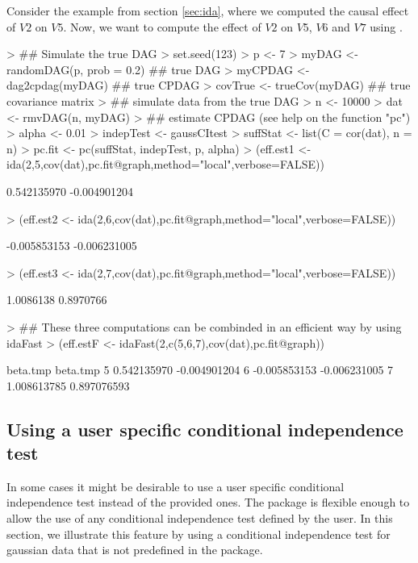 \documentclass[article]{jss}
\begin{document}
Consider the example from section \ref{sec:ida}, where we computed the
causal effect of $V2$ on $V5$. Now, we want to compute the effect of
$V2$ on $V5$, $V6$ and $V7$ using .
\begin{Schunk}
\begin{Sinput}
> ## Simulate the true DAG
> set.seed(123)
> p <- 7
> myDAG <- randomDAG(p, prob = 0.2) ## true DAG
> myCPDAG <- dag2cpdag(myDAG) ## true CPDAG
> covTrue <- trueCov(myDAG) ## true covariance matrix
> ## simulate data from the true DAG
> n <- 10000
> dat <- rmvDAG(n, myDAG)
> ## estimate CPDAG (see help on the function "pc")
> alpha <- 0.01
> indepTest <- gaussCItest 
> suffStat <- list(C = cor(dat), n = n)
> pc.fit <- pc(suffStat, indepTest, p, alpha)
> (eff.est1 <- ida(2,5,cov(dat),pc.fit@graph,method="local",verbose=FALSE))
\end{Sinput}
\begin{Soutput}
[1]  0.542135970 -0.004901204
\end{Soutput}
\begin{Sinput}
> (eff.est2 <- ida(2,6,cov(dat),pc.fit@graph,method="local",verbose=FALSE))
\end{Sinput}
\begin{Soutput}
[1] -0.005853153 -0.006231005
\end{Soutput}
\begin{Sinput}
> (eff.est3 <- ida(2,7,cov(dat),pc.fit@graph,method="local",verbose=FALSE))
\end{Sinput}
\begin{Soutput}
[1] 1.0086138 0.8970766
\end{Soutput}
\begin{Sinput}
> ## These three computations can be combinded in an efficient way by using idaFast
> (eff.estF <- idaFast(2,c(5,6,7),cov(dat),pc.fit@graph))
\end{Sinput}
\begin{Soutput}
      beta.tmp     beta.tmp
5  0.542135970 -0.004901204
6 -0.005853153 -0.006231005
7  1.008613785  0.897076593
\end{Soutput}
\end{Schunk}

\subsection{Using a user specific conditional independence test}
In some cases it might be desirable to use a user specific conditional
independence test instead of the provided ones. The  package is
flexible enough to allow the use of any conditional independence test
defined by the user. In this section, we illustrate this feature by using a
conditional independence test for gaussian data that is not predefined in
the package.
\end{document}
